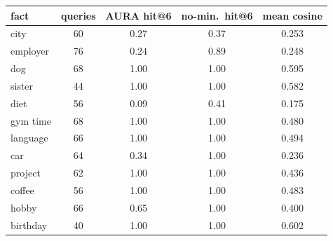 \begin{tabular}{lcccc}
\toprule
fact & queries & AURA hit@6 & no-min.\ hit@6 & mean cosine \\
\midrule
city & 60 & 0.27 & 0.37 & 0.253 \\
employer & 76 & 0.24 & 0.89 & 0.248 \\
dog & 68 & 1.00 & 1.00 & 0.595 \\
sister & 44 & 1.00 & 1.00 & 0.582 \\
diet & 56 & 0.09 & 0.41 & 0.175 \\
gym time & 68 & 1.00 & 1.00 & 0.480 \\
language & 66 & 1.00 & 1.00 & 0.494 \\
car & 64 & 0.34 & 1.00 & 0.236 \\
project & 62 & 1.00 & 1.00 & 0.436 \\
coffee & 56 & 1.00 & 1.00 & 0.483 \\
hobby & 66 & 0.65 & 1.00 & 0.400 \\
birthday & 40 & 1.00 & 1.00 & 0.602 \\
\bottomrule
\end{tabular}
